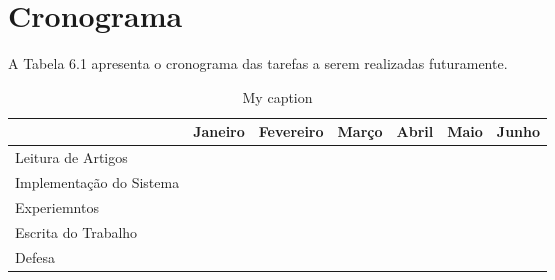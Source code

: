 \chapter{Cronograma}

A Tabela 6.1 apresenta o cronograma das tarefas a serem realizadas futuramente.

\begin{table}[]
	\centering
	\caption{My caption}
	\label{my-label}
	\begin{tabular}{|l|l|l|l|l|l|l|}
		\hline
		& Janeiro & Fevereiro & Março & Abril & Maio & Junho \\ \hline
		Leitura de Artigos       &         &           &       &       &      &       \\ \hline
		Implementação do Sistema &         &           &       &       &      &       \\ \hline
		Experiemntos             &         &           &       &       &      &       \\ \hline
		Escrita do Trabalho      &         &           &       &       &      &       \\ \hline
		Defesa                   &         &           &       &       &      &       \\ \hline
	\end{tabular}
\end{table}